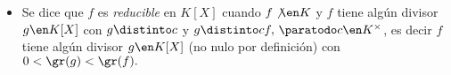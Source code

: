 \begin{itemize}
\begin{itemize}
          \item
                Se dice que $f$ es \textit{reducible} en $K[X]$ cuando $f \not\en K$ y $f$ tiene algún divisor $g \en K[X]$ con
                $g \distinto c$ y $g \distinto cf,\, \paratodo c \en K^{\times}$, es decir $f$ tiene algún divisor $g \en K[X]$ (no nulo
                por definición) con $0 < \gr(g) < \gr(f).$
        \end{itemize}
\end{itemize}
